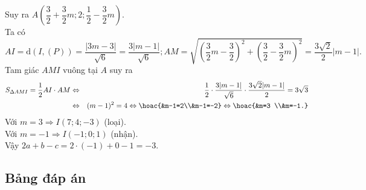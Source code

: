 \begin{ex}
{		Suy ra $A\left(\dfrac{3}{2}+\dfrac{3}{2}m;2;\dfrac{1}{2}-\dfrac{3}{2} m\right)$.\\
		Ta có $$AI=\mathrm{d}(I,(P))=\dfrac{|3 m-3|}{\sqrt{6}}=\dfrac{3|m-1|}{\sqrt{6}} ; A M=\sqrt{\left(\dfrac{3}{2} m-\dfrac{3}{2}\right)^2+\left(\frac{3}{2}-\frac{3}{2} m\right)^2}=\dfrac{3 \sqrt{2}}{2}|m-1|.$$
		Tam giác $AMI$ vuông tại $A$ suy ra
		\allowdisplaybreaks
		\begin{eqnarray*}
			S_{\Delta AMI}=\dfrac{1}{2} AI \cdot AM &\Leftrightarrow&\dfrac{1}{2}\cdot \dfrac{3 |m-1|}{\sqrt{6}} \cdot \frac{3 \sqrt{2}|m-1|}{2}=3 \sqrt{3} \\
			&\Leftrightarrow& (m-1)^2=4\Leftrightarrow\hoac{&m-1=2\\&m-1=-2} \Leftrightarrow \hoac{&m=3 \\&m=-1.}
		\end{eqnarray*}
		Với $m=3 \Rightarrow I(7;4;-3)$ (loại).\\
		Với $m=-1 \Rightarrow I(-1;0;1)$ (nhận).\\
		Vậy $2a+b-c=2 \cdot(-1)+0-1=-3$.
	}
\end{ex}
\subsection{Bảng đáp án}


